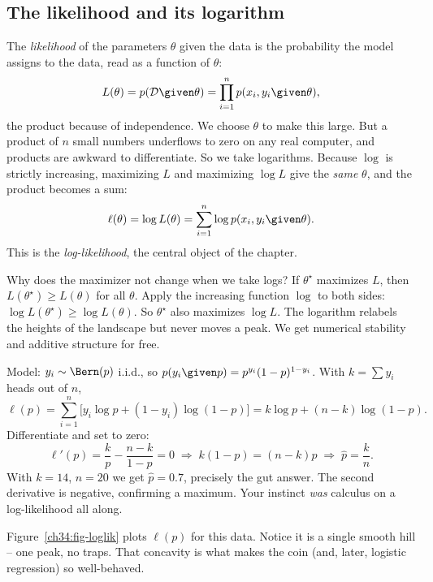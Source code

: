 \subsection{The likelihood and its logarithm}

The \emph{likelihood} of the parameters $\theta$ given the data is the
probability the model assigns to the data, read as a function of $\theta$:
\[
  L(\theta) = p(\mathcal{D}\given\theta) = \prod_{i=1}^n p(x_i,y_i\given\theta),
\]
the product because of independence. We choose $\theta$ to make this large. But a
product of $n$ small numbers underflows to zero on any real computer, and
products are awkward to differentiate. So we take logarithms. Because $\log$ is
strictly increasing, maximizing $L$ and maximizing $\log L$ give the \emph{same}
$\theta$, and the product becomes a sum:
\[
  \ell(\theta) = \log L(\theta) = \sum_{i=1}^n \log p(x_i,y_i\given\theta).
\]
This is the \emph{log-likelihood}, the central object of the chapter.

\begin{whybox}
Why does the maximizer not change when we take logs? If $\theta^\star$ maximizes
$L$, then $L(\theta^\star) \ge L(\theta)$ for all $\theta$. Apply the increasing
function $\log$ to both sides: $\log L(\theta^\star) \ge \log L(\theta)$. So
$\theta^\star$ also maximizes $\log L$. The logarithm relabels the heights of the
landscape but never moves a peak. We get numerical stability and additive
structure for free.
\end{whybox}

\begin{example}
\label{ch34:coin-mle}
Model: $y_i \sim \Bern(p)$ i.i.d., so $p(y_i\given p) = p^{y_i}(1-p)^{1-y_i}$. With
$k = \sum y_i$ heads out of $n$,
\[
  \ell(p) = \sum_{i=1}^n \big[y_i\log p + (1-y_i)\log(1-p)\big]
          = k\log p + (n-k)\log(1-p).
\]
Differentiate and set to zero:
\[
  \ell'(p) = \frac{k}{p} - \frac{n-k}{1-p} = 0
  \;\Longrightarrow\; k(1-p) = (n-k)p
  \;\Longrightarrow\; \hat p = \frac{k}{n}.
\]
With $k=14$, $n=20$ we get $\hat p = 0.7$, precisely the gut answer. The second
derivative is negative, confirming a maximum. Your instinct \emph{was} calculus
on a log-likelihood all along.
\end{example}

Figure~\ref{ch34:fig-loglik} plots $\ell(p)$ for this data. Notice it is a single
smooth hill -- one peak, no traps. That concavity is what makes the coin (and,
later, logistic regression) so well-behaved.

